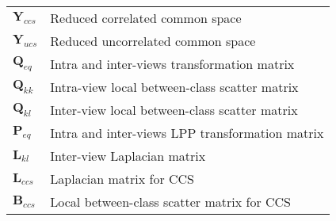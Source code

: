\begin{longtable}{ll}
${{\mathbf{Y}}_{ccs}}$ & Reduced correlated common space \\
${{\mathbf{Y}}_{ucs}}$ & Reduced uncorrelated common space \\
${{\mathbf{Q}}_{eq}}$ & Intra and inter-views transformation matrix \\
${{\mathbf{Q}}_{kk}}$ & Intra-view local between-class scatter matrix \\
${{\mathbf{Q}}_{kl}}$ & Inter-view local between-class scatter matrix \\
${{\mathbf{P}}_{eq}}$ & Intra and inter-views LPP transformation matrix \\
${{\mathbf{L}}_{kl}}$ & Inter-view Laplacian matrix \\
${{\mathbf{L}}_{ccs}}$ & Laplacian matrix for CCS \\
${{\mathbf{B}}_{ccs}}$ & Local between-class scatter matrix for CCS \\


\end{longtable}
